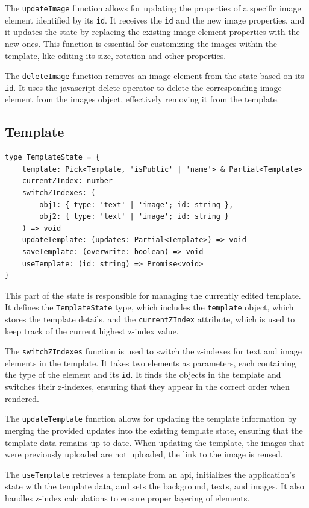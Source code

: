 The \texttt{updateImage} function allows for updating the properties of a specific image element identified by its \texttt{id}. It receives the \texttt{id} and the new image properties, and it updates the state by replacing the existing image element properties with the new ones. This function is essential for customizing the images within the template, like editing its size, rotation and other properties.

The \texttt{deleteImage} function removes an image element from the state based on its \texttt{id}. It uses the javascript delete operator to delete the corresponding image element from the images object, effectively removing it from the template.

\subsection{Template}
\begin{verbatim}
type TemplateState = {
    template: Pick<Template, 'isPublic' | 'name'> & Partial<Template>
    currentZIndex: number
    switchZIndexes: (
        obj1: { type: 'text' | 'image'; id: string },
        obj2: { type: 'text' | 'image'; id: string }
    ) => void
    updateTemplate: (updates: Partial<Template>) => void
    saveTemplate: (overwrite: boolean) => void
    useTemplate: (id: string) => Promise<void>
}
\end{verbatim}

This part of the state is responsible for managing the currently edited template. It defines the \texttt{TemplateState} type, which includes the \texttt{template} object, which stores the template details, and the \texttt{currentZIndex} attribute, which is used to keep track of the current highest z-index value.

The \texttt{switchZIndexes} function is used to switch the z-indexes for text and image elements in the template. It takes two elements as parameters, each containing the type of the element and its \texttt{id}. It finds the objects in the template and switches their z-indexes, ensuring that they appear in the correct order when rendered.

The \texttt{updateTemplate} function allows for updating the template information by merging the provided updates into the existing template state, ensuring that the template data remains up-to-date. When updating the template, the images that were previously uploaded are not uploaded, the link to the image is reused.

The \texttt{useTemplate} retrieves a template from an \acrshort{api}, initializes the application's state with the template data, and sets the background, texts, and images. It also handles z-index calculations to ensure proper layering of elements.

